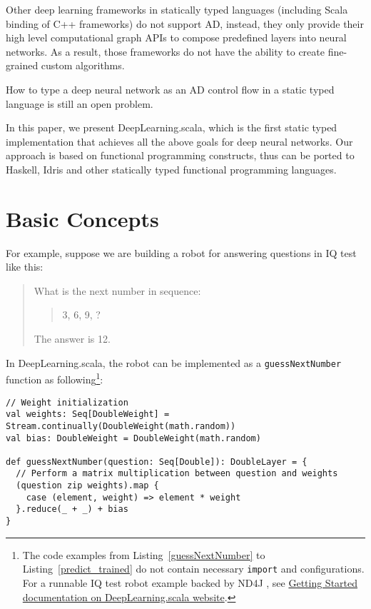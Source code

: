 Other deep learning frameworks in statically typed languages (including Scala binding of C++ frameworks) \cite{intel2016bigdl,skymind2017deeplearning4j,baydin2016hype,chen2017typesafe,zhao2017deepdsl} do not support AD, instead, they only provide their high level \gls{computational graph} APIs to compose predefined layers into neural networks. As a result, those frameworks do not have the ability to create fine-grained custom algorithms.

How to type a deep neural network as an AD control flow in a static typed language is still an open problem.

In this paper, we present DeepLearning.scala, which is the first static typed implementation that achieves all the above goals for deep neural networks. Our approach is based on functional programming constructs, thus can be ported to Haskell, Idris and other statically typed functional programming languages.

\section{Basic Concepts}
\label{concepts}

For example, suppose we are building a robot for answering questions in IQ test like this:

\begin{quote}
  What is the next number in sequence:
    \begin{quote}
    3, 6, 9, ?
    \end{quote}
  The answer is 12.
\end{quote}

In DeepLearning.scala, the robot can be implemented as a \lstinline{guessNextNumber} function as following\footnote{The code examples from Listing~\ref{guessNextNumber} to Listing~\ref{predict_trained} do not contain necessary \lstinline{import} and configurations. For a runnable IQ test robot example backed by ND4J \cite{skymind2017nd4j}, see \href{http://deeplearning.thoughtworks.school/demo/GettingStarted.html}{Getting Started documentation on DeepLearning.scala website}.}:

\begin{lstlisting}[float={h t b p},caption={The differentiable matrix multiplication implemented by \lstinline{map}/\lstinline{reduce}},label={guessNextNumber}]
// Weight initialization
val weights: Seq[DoubleWeight] = Stream.continually(DoubleWeight(math.random))
val bias: DoubleWeight = DoubleWeight(math.random)

def guessNextNumber(question: Seq[Double]): DoubleLayer = {
  // Perform a matrix multiplication between question and weights
  (question zip weights).map {
    case (element, weight) => element * weight
  }.reduce(_ + _) + bias
}
\end{lstlisting}

